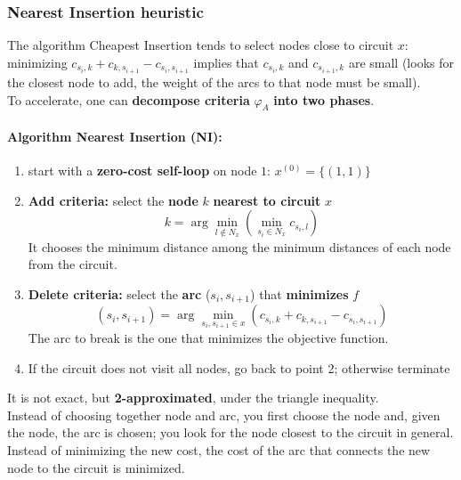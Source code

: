 \documentclass[11pt]{article}
\begin{document}
	\newpage
	
	\subsubsection{Nearest Insertion heuristic}
	The algorithm Cheapest Insertion tends to select nodes close to circuit $x$: minimizing $c_{s_i ,k} + c_{k,s_{i+1}} - c_{s_i ,s_{i+1}}$ implies that $c_{s_i ,k}$ and $c_{s_{i+1},k}$ are small (looks for the closest node to add, the weight of the arcs to that node must be small).\\
	
	To accelerate, one can \textbf{decompose criteria} $\varphi_A$ \textbf{into two phases}.\\
	
	\paragraph{Algorithm Nearest Insertion (NI):}
	\begin{enumerate}
		\item start with a \textbf{zero-cost self-loop} on node $1$: $x^{(0)} = \{(1, 1)\}$
		
		\item \textbf{Add criteria:} select the \textbf{node} $k$ \textbf{nearest to circuit} $x$
		$$ k = \arg \min_{l \notin N_x} \left(\min_{s_i \in N_x} c_{s_i, l} \right) $$
		It chooses the minimum distance among the minimum distances of each node from the circuit.
		
		\item \textbf{Delete criteria:} select the \textbf{arc} ($s_i , s_{i+1}$) that \textbf{minimizes} $f$
		$$ (s_i, s_{i+1}) = \arg \min_{s_i, s_{i+1} \in x} \left(c_{s_i, k} + c_{k, s_{i+1}} - c_{s_i, s_{i+1}}\right) $$
		The arc to break is the one that minimizes the objective function.
		
		\item If the circuit does not visit all nodes, go back to point 2; otherwise terminate
	\end{enumerate}
	
	It is not exact, but \textbf{2-approximated}, under the triangle inequality.\\
	
	Instead of choosing together node and arc, you first choose the node and, given the node, the arc is chosen; you look for the node closest to the circuit in general. \\
	Instead of minimizing the new cost, the cost of the arc that connects the new node to the circuit is minimized.\\
	
\end{document}
